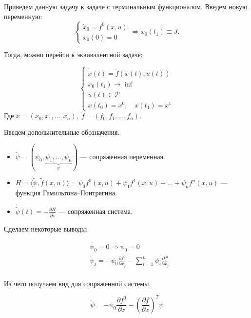 \documentclass[oneside, final, 14pt, draft]{article}
\theoremstyle{definition}
\theoremstyle{definition}
\theoremstyle{remark}
\theoremstyle{theorem}
\begin{document}
{\flushleft Приведем данную задачу к задаче с терминальным функционалом. Введем новую переменную:}
\begin{equation*}
	\begin{cases}
		\dot x_0 = f^0(x,u)\\
		x_0(0) = 0
	\end{cases} \Rightarrow x_0(t_1) \equiv J.
\end{equation*}

{\flushleft Тогда, можно перейти к эквивалентной задаче:}

\begin{equation}\label{fsystem}
	\begin{cases}
		\dot{\widetilde{x}}(t) = \widetilde{f}(\widetilde{x}(t),u(t))\\
		x_0(t_1) \longrightarrow \inf\\
		u(t) \in \mathcal{P}\\
		x(t_0) = x^0,\quad x(t_1) = x^1
	\end{cases}
\end{equation}
Где $\widetilde{x} = (x_0,x_1,\ldots,x_n),\; \widetilde{f} = (f_0,f_1,\ldots,f_n)$.

{\flushleft Введем допольнительные обозначения.}

\begin{itemize}
\item $\widetilde{\psi} = (\psi_0,\underbrace{\psi_1,\ldots,\psi_n}_\psi) \text{ --- сопряженная переменная}.$
\item $H = \langle \widetilde{\psi}, \widetilde{f}(x,u)\rangle = \psi_0 f^0(x,u) + \psi_1 f^1(x,u) + ... + \psi_n f^n(x,u)$ --- функция Гамильтона--Понтрягина.
\item $\dot{\widetilde{\psi}}(t) = -\displaystyle \frac{\partial H}{\partial \widetilde{x}}$ --- сопряженная система.
\end{itemize}

Сделаем некоторые выводы:

\begin{align*}
&\dot{\psi_0} = 0 \Rightarrow \psi_0 = 0\\
&\dot{\psi}_j = - \psi_0 \frac{\partial f^0}{\partial x_j} - \sum\limits_{i = 1}^{n} \psi_i \frac{\partial f^i}{\partial x_j}\\
\end{align*}

Из чего получаем вид для сопряженной системы.

$$\dot{\psi} = - \psi_0 \frac{\partial f^0}{\partial x} - \left( \frac{\partial f}{\partial x}\right)^T \psi$$
\end{document}
